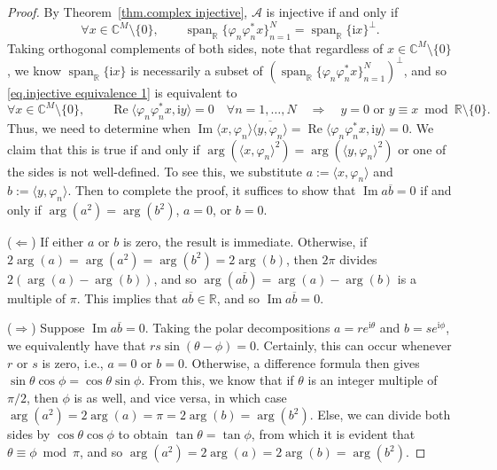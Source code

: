 \documentclass[times,10pt]{elsarticle}
\theoremstyle{plain}
\begin{document}
\begin{proof}
By Theorem~\ref{thm.complex injective}, $\mathcal{A}$ is injective if and only if
\begin{equation}
\label{eq.injective equivalence 1}
\forall x\in\mathbb{C}^M\setminus\{0\}, \qquad\operatorname{span}_\mathbb{R}\{\varphi_n\varphi_n^*x\}_{n=1}^N=\operatorname{span}_\mathbb{R}\{\mathrm{i}x\}^{\perp}.
\end{equation}
Taking orthogonal complements of both sides, note that regardless of $x\in\mathbb{C}^M\setminus\{0\}$, we know $\operatorname{span}_\mathbb{R}\{\mathrm{i}x\}$ is necessarily a subset of $(\operatorname{span}_\mathbb{R}\{\varphi_n\varphi_n^*x\}_{n=1}^N)^\perp$, and so \eqref{eq.injective equivalence 1} is equivalent to
\begin{equation*}
\forall x\in\mathbb{C}^M\setminus\{0\},\qquad\operatorname{Re}\langle\varphi_n\varphi_n^*x,\mathrm{i}y\rangle=0\quad\forall n=1,\ldots,N\quad\Longrightarrow\quad y=0 \text{ or } y\equiv x\bmod\mathbb{R}\setminus\{0\}.
\end{equation*}
Thus, we need to determine when $\operatorname{Im}\langle x,\varphi_n\rangle\overline{\langle y,\varphi_n\rangle}=\operatorname{Re}\langle\varphi_n\varphi_n^*x,\mathrm{i}y\rangle=0$.
We claim that this is true if and only if $\operatorname{arg}(\langle x,\varphi_n\rangle^2)=\operatorname{arg}(\langle y,\varphi_n\rangle^2)$ or one of the sides is not well-defined.
To see this, we substitute $a:=\langle x,\varphi_n\rangle$ and $b:=\langle y,\varphi_n\rangle$.
Then to complete the proof, it suffices to show that $\operatorname{Im}a\overline{b}=0$ if and only if $\operatorname{arg}(a^2)=\operatorname{arg}(b^2)$, $a=0$, or $b=0$.

($\Leftarrow$)
If either $a$ or $b$ is zero, the result is immediate.
Otherwise, if $2\operatorname{arg}(a)=\operatorname{arg}(a^2)=\operatorname{arg}(b^2)=2\operatorname{arg}(b)$, then $2\pi$ divides $2(\operatorname{arg}(a)-\operatorname{arg}(b))$, and so $\operatorname{arg}(a\overline{b})=\operatorname{arg}(a)-\operatorname{arg}(b)$ is a multiple of $\pi$.
This implies that $a\overline{b}\in\mathbb{R}$, and so $\operatorname{Im}a\overline{b}=0$.

($\Rightarrow$)
Suppose $\operatorname{Im}a\overline{b}=0$.
Taking the polar decompositions $a=re^{\mathrm{i}\theta}$ and $b=se^{\mathrm{i}\phi}$, we equivalently have that $rs\sin{(\theta-\phi)}=0$.
Certainly, this can occur whenever $r$ or $s$ is zero, i.e., $a=0$ or $b=0$.
Otherwise, a difference formula then gives $\sin{\theta}\cos{\phi}=\cos{\theta}\sin{\phi}$.
From this, we know that if $\theta$ is an integer multiple of $\pi/2$, then $\phi$ is as well, and vice versa, in which case $\operatorname{arg}(a^2)=2\operatorname{arg}(a)=\pi=2\operatorname{arg}(b)=\operatorname{arg}(b^2)$.
Else, we can divide both sides by $\cos{\theta}\cos{\phi}$ to obtain $\tan{\theta}=\tan{\phi}$, from which it is evident that $\theta\equiv\phi\bmod\pi$, and so $\operatorname{arg}(a^2)=2\operatorname{arg}(a)=2\operatorname{arg}(b)=\operatorname{arg}(b^2)$.
\qquad
\end{proof}
\end{document}
